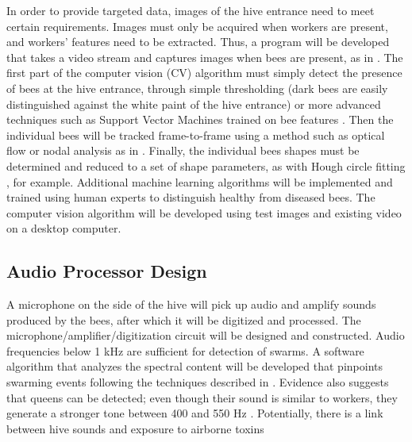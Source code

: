 In order to provide targeted data, images of the hive entrance need to meet certain requirements. Images must only be acquired when workers are present, and workers' features need to be extracted. Thus, a program will be developed that takes a video stream and captures images when bees are present, as in \cite{campbell2008video}. The first part of the computer vision (CV) algorithm must simply detect the presence of bees at the hive entrance, through simple thresholding (dark bees are easily distinguished against the white paint of the hive entrance) or more advanced techniques such as Support Vector Machines trained on bee features \cite{azarcoya2014automatic}. Then the individual bees will be tracked frame-to-frame using a method such as optical flow \cite{horn1981determining} or nodal analysis as in \cite{campbell2008video}. Finally, the individual bees shapes must be determined and reduced to a set of shape parameters, as with Hough circle fitting \cite{yuen1990comparative}, for example. Additional machine learning algorithms will be implemented and trained using human experts to distinguish healthy from diseased bees. The computer vision algorithm will be developed using test images and existing video on a desktop computer.

\subsection{Audio Processor Design}

A microphone on the side of the hive will pick up audio and amplify sounds produced by the bees, after which it will  be digitized and processed. The microphone/amplifier/digitization circuit will be designed and constructed. Audio frequencies below 1 kHz are sufficient for detection of swarms. A software algorithm that analyzes the spectral content will be developed that pinpoints swarming events following the techniques described in \cite{ferrari2008monitoring}. Evidence also suggests that queens can be detected; even though their sound is similar to workers, they generate a stronger tone between 400 and 550 Hz \cite{eren1997electronic}. Potentially, there is a link between hive sounds and exposure to airborne toxins \cite{bromenshenk2009honey}

